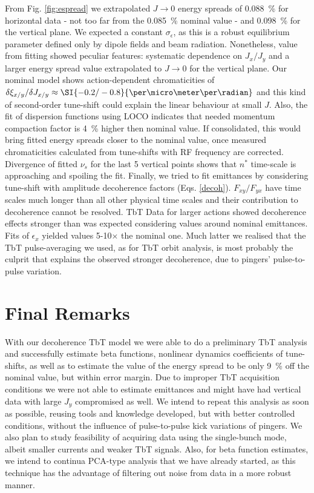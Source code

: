 \documentclass[a4paper,
               keeplastbox,   %
               ]{jacow}
\begin{document}
From Fig. \ref{fig:espread} we extrapolated $J \rightarrow 0$ energy spreads of \SI{0.088}{\percent} for horizontal data - not too far from the \SI{0.085}{\percent} nominal value - and \SI{0.098}{\percent} for the vertical plane. We expected a constant $\sigma_\epsilon$, as this is a robust equilibrium parameter defined only by dipole fields and beam radiation. Nonetheless, value from fitting showed peculiar features: systematic dependence on $J_x/J_y$ and a larger energy spread value extrapolated to $J \rightarrow 0$ for the vertical plane. Our nominal model shows action-dependent chromaticities of $\delta\xi_{x/y}/\delta J_{x/y} \approx \SI{-0.2/-0.8}{\per\micro\meter\per\radian}$ and this kind of second-order tune-shift could explain the linear behaviour at small $J$. Also, the fit of dispersion functions using LOCO\cite{murilo} indicates that needed momentum compaction factor is \SI{4}{\percent} higher then nominal value. If consolidated, this would bring fitted energy spreads closer to the nominal value, once measured chromaticities calculated from tune-shifts with RF frequency are corrected. Divergence of fitted $\nu_s$ for the last 5 vertical points shows that $n^*$ time-scale is approaching and spoiling the fit.
Finally, we tried to fit emittances by considering tune-shift with amplitude decoherence factors (Eqs. \ref{decoh}). $F_{xy}/F_{yx}$ have time scales much longer than all other physical time scales and their contribution to decoherence cannot be resolved. TbT Data for larger actions showed decoherence effects stronger than was expected considering values around nominal emittances. Fits of $\epsilon_x$ yielded values \num{5}-\num{10}$\times$ the nominal one. Much latter we realised that the TbT pulse-averaging we used, as for TbT orbit analysis, is most probably the culprit that explains the observed stronger decoherence, due to pingers' pulse-to-pulse variation.

\section{Final Remarks}

With our decoherence TbT model we were able to do a preliminary TbT analysis and successfully estimate beta functions, nonlinear dynamics coefficients of tune-shifts, as well as to estimate the value of the energy spread to be only \SI{9}{\percent} off the nominal value, but within error margin.
Due to improper TbT acquisition conditions we were not able to estimate emittances and might have had vertical data with large $J_y$ compromised as well. We intend to repeat this analysis as soon as possible, reusing tools and knowledge developed, but with better controlled conditions, without the influence of pulse-to-pulse kick variations of pingers. We also plan to study feasibility of acquiring data using the single-bunch mode, albeit smaller currents and weaker TbT signals.
Also, for beta function estimates, we intend to continua PCA-type analysis that we have already started, as this technique has the advantage of filtering out noise from data in a more robust manner.
\end{document}
